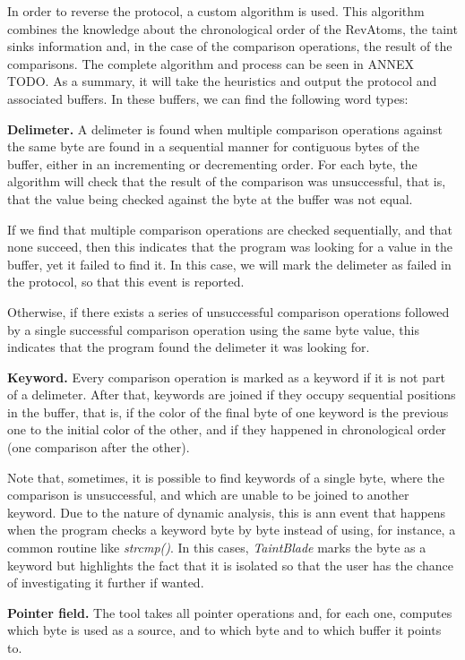 \documentclass[conference]{IEEEtran}
\begin{document}
In order to reverse the protocol, a custom algorithm is used. This algorithm
combines the knowledge about the chronological order of the RevAtoms, the taint
sinks information and, in the case of the comparison operations, the result of
the comparisons. The complete algorithm and process can be seen in ANNEX TODO.
As a summary, it will take the heuristics and output the protocol and
associated buffers. In these buffers, we can find the following word types:

\textbf{Delimeter.} A delimeter is found when multiple comparison operations against the same byte
are found in a sequential manner for contiguous bytes of the buffer, either in an incrementing
or decrementing order. For each byte, the algorithm will check that the result of the comparison
was unsuccessful, that is, that the value being checked against the byte at the buffer was not equal.

If we find that multiple comparison operations are checked sequentially, and
that none succeed, then this indicates that the program was looking for a value
in the buffer, yet it failed to find it. In this case, we will mark the
delimeter as failed in the protocol, so that this event is reported.

Otherwise, if there exists a series of unsuccessful comparison operations
followed by a single successful comparison operation using the same byte value,
this indicates that the program found the delimeter it was looking for.

\textbf{Keyword.} Every comparison operation is marked as a keyword if it is not part of a delimeter. After that,
keywords are joined if they occupy sequential positions in the buffer, that is, if the color of the final byte of
one keyword is the previous one to the initial color of the other, and if they happened in chronological order
(one comparison after the other).

Note that, sometimes, it is possible to find keywords of a single byte, where
the comparison is unsuccessful, and which are unable to be joined to another
keyword. Due to the nature of dynamic analysis, this is ann event that happens
when the program checks a keyword byte by byte instead of using, for instance,
a common routine like \textit{strcmp()}. In this cases, \textit{TaintBlade}
marks the byte as a keyword but highlights the fact that it is isolated so that
the user has the chance of investigating it further if wanted.

\textbf{Pointer field.} The tool takes all pointer operations and, for each one, computes which byte is used as a source,
and to which byte and to which buffer it points to.
\end{document}
